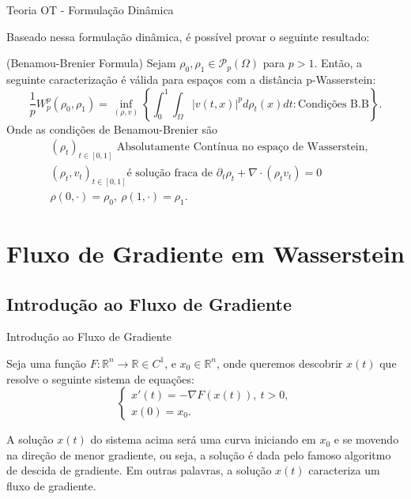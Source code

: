 \documentclass[10pt]{beamer}
\begin{document}
\begin{frame}[fragile]{Teoria OT - Formulação Dinâmica}

	Baseado nessa formulação dinâmica, é possível provar o
	seguinte resultado:

	\begin{theorem}{(Benamou-Brenier Formula)}
	\label{theorem.Benamou-Brenier}
	Sejam $\rho_0, \rho_1 \in \mathcal P_p(\Omega)$ para $p>1$.
	Então, a seguinte caracterização é válida para espaços com a distância p-Wasserstein:
	\begin{equation*}
	\frac{1}{p}W^p_p(\rho_0, \rho_1) 
	= 
	\inf_{(\rho, v)}
	\left\{
	\int_0^1\int_{\Omega}\left|v(t,x)\right|^p d \rho_t(x)d t: \text{Condições B.B}
	\right\}.
	\end{equation*}
	Onde as condições de Benamou-Brenier são
	\begin{align*}
	&(\rho_t)_{t \in [0,1]} \text{ Absolutamente Contínua no espaço de Wasserstein}, \\
	&(\rho_t, v_t)_{t \in [0,1]} \text{é solução fraca de }
	\partial_t \rho_t + \nabla\cdot\left(\rho_t v_t\right) = 0
	\\
	&\rho(0,\cdot) = \rho_0, \ \rho(1, \cdot) = \rho_1 .
	\end{align*}
\end{theorem} 
\end{frame}

\AtBeginSection{}
\section[Fluxo de Gradiente em Wasserstein]{Fluxo de Gradiente em Wasserstein}
\subsection{Introdução ao Fluxo de Gradiente}
\begin{frame}[fragile]{Introdução ao Fluxo de Gradiente}

	Seja uma função $F:\mathbb R^n \to \mathbb R \in C^1$, e $x_0 \in \mathbb R^n$,
	onde queremos descobrir $x(t)$ que resolve o seguinte sistema de equações:
	\begin{equation}
		\begin{cases}
			x'(t) = -\nabla F(x(t)), \ t>0,\\
			x(0)  = x_0.
		\end{cases}
		\label{eq:fluxograd}
	\end{equation}

	A solução $x(t)$ do sistema acima será uma curva iniciando em $x_0$ e se movendo
	na direção de menor gradiente, ou seja, a solução é dada
	pelo famoso algoritmo de descida de gradiente. Em outras palavras,
	a solução $x(t)$ caracteriza um fluxo de gradiente.

\end{frame}
\end{document}
